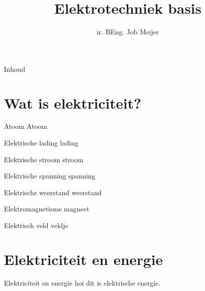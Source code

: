 \documentclass{beamer}
\title{Elektrotechniek basis}
\author{ir. BEng. Job Meijer}
\institute{Club van Draadje}
\begin{document}
\begin{frame}
    \titlepage
\end{frame}

\begin{frame}{Inhoud}
	\tableofcontents
\end{frame}


\section{Wat is elektriciteit?}

\begin{frame}{Atoom}
	Atoom \\
\end{frame}

\begin{frame}{Elektrische lading}
	lading \\
\end{frame}

\begin{frame}{Elektrische stroom}
	stroom\\
\end{frame}

\begin{frame}{Elektrische spanning}
	spanning \\
\end{frame}

\begin{frame}{Elektrische weerstand}
	weerstand \\
\end{frame}

\begin{frame}{Elektromagnetisme}
	magneet \\
\end{frame}

\begin{frame}{Elektrisch veld}
	veldje \\
\end{frame}
	
	
\section{Elektriciteit en energie}
\begin{frame}{Elektriciteit en energie}
	hoi dit is elektrische energie. \\
\end{frame}
\end{document}
